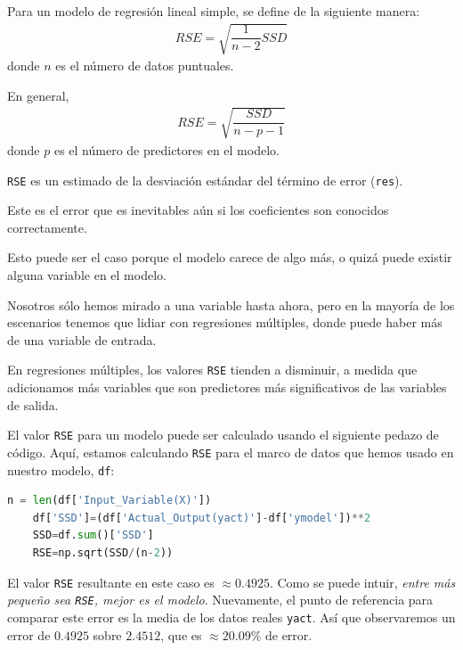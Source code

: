 Para un modelo de regresión lineal simple, se define de la siguiente manera:
\begin{align}
	RSE = \sqrt{\dfrac{1}{n-2}SSD}
\end{align}
donde $n$ es el número de datos puntuales.



En general,
\begin{align}
	RSE = \sqrt{\dfrac{SSD}{n-p-1}}
\end{align}
donde $p$ es el número de predictores en el modelo.



\texttt{RSE} es un estimado de la desviación estándar del término de error (\texttt{res}).


Este es el error que es inevitables aún si los coeficientes son conocidos correctamente.



Esto puede ser el caso porque el modelo carece de algo más, o quizá puede existir alguna variable en el modelo.



Nosotros sólo hemos mirado a una variable hasta ahora, pero en la mayoría de los escenarios tenemos que lidiar con regresiones múltiples, donde puede haber más de una variable de entrada.



En regresiones múltiples, los valores \texttt{RSE} tienden a disminuir, a medida que adicionamos más variables que son predictores más significativos de las variables de salida.




El valor \texttt{RSE} para un modelo puede ser calculado usando el siguiente pedazo de código. Aquí, estamos calculando \texttt{RSE} para el marco de datos que hemos usado en nuestro modelo, \texttt{df}:


\begin{lstlisting}[language=Python]
	n = len(df['Input_Variable(X)'])
	df['SSD']=(df['Actual_Output(yact)']-df['ymodel'])**2
	SSD=df.sum()['SSD']
	RSE=np.sqrt(SSD/(n-2))
\end{lstlisting}



El valor \texttt{RSE} resultante en este caso es $\approx 0.4925$. Como se puede intuir, \emph{entre más pequeño sea \texttt{RSE}, mejor es el modelo}. Nuevamente, el punto de referencia para comparar este error es la media de los datos reales \texttt{yact}. Así que observaremos un error de $0.4925$ sobre $2.4512$, que es $\approx 20.09\%$ de error.

